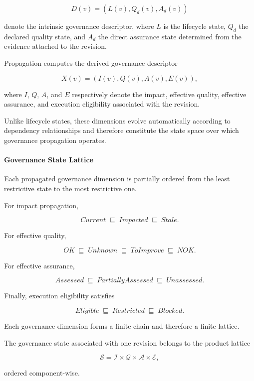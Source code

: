 \documentclass[10pt]{article}
\begin{document}
\[
D(v)=
\left(
L(v),
Q_d(v),
A_d(v)
\right)
\]

denote the intrinsic governance descriptor, where $L$ is the lifecycle state,
$Q_d$ the declared quality state, and $A_d$ the direct assurance state
determined from the evidence attached to the revision.

Propagation computes the derived governance descriptor

\[
X(v)=
\left(
I(v),
Q(v),
A(v),
E(v)
\right),
\]

where $I$, $Q$, $A$, and $E$ respectively denote the impact, effective quality,
effective assurance, and execution eligibility associated with the revision.

Unlike lifecycle states, these dimensions evolve automatically according to
dependency relationships and therefore constitute the state space over which
governance propagation operates.


\paragraph{Governance State Lattice}

Each propagated governance dimension is partially ordered from the least
restrictive state to the most restrictive one.

For impact propagation,

\[
Current
\;\sqsubseteq\;
Impacted
\;\sqsubseteq\;
Stale.
\]

For effective quality,

\[
OK
\;\sqsubseteq\;
Unknown
\;\sqsubseteq\;
ToImprove
\;\sqsubseteq\;
NOK.
\]

For effective assurance,

\[
Assessed
\;\sqsubseteq\;
PartiallyAssessed
\;\sqsubseteq\;
Unassessed.
\]

Finally, execution eligibility satisfies

\[
Eligible
\;\sqsubseteq\;
Restricted
\;\sqsubseteq\;
Blocked.
\]

Each governance dimension forms a finite chain and therefore a finite lattice.

The governance state associated with one revision belongs to the product lattice

\[
\mathcal{S}
=
\mathcal{I}
\times
\mathcal{Q}
\times
\mathcal{A}
\times
\mathcal{E},
\]

ordered component-wise.
\end{document}
